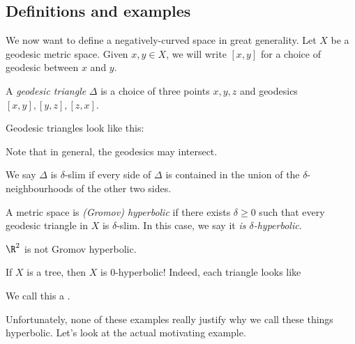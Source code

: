 \documentclass[a4paper]{article}
\begin{document}
\subsection{Definitions and examples}
We now want to define a negatively-curved space in great generality. Let $X$ be a geodesic metric space. Given $x, y \in X$, we will write $[x, y]$ for a choice of geodesic between $x$ and $y$.

\begin{defi}
  A \emph{geodesic triangle} $\Delta$ is a choice of three points $x, y, z$ and geodesics $[x, y], [y, z], [z, x]$.
\end{defi}
Geodesic triangles look like this:
\begin{center}
\end{center}
Note that in general, the geodesics may intersect.

\begin{defi}
  We say $\Delta$ is $\delta$-slim if every side of $\Delta$ is contained in the union of the $\delta$-neighbourhoods of the other two sides.
\end{defi}

\begin{defi}
  A metric space is \emph{(Gromov) hyperbolic} if there exists $\delta \geq 0$ such that every geodesic triangle in $X$ is $\delta$-slim. In this case, we say it \emph{is $\delta$-hyperbolic}.
\end{defi}

\begin{eg}
  $\R^2$ is not Gromov hyperbolic.
\end{eg}

\begin{eg}
  If $X$ is a tree, then $X$ is $0$-hyperbolic! Indeed, each triangle looks like
  \begin{center}
  \end{center}
  We call this a .
\end{eg}
Unfortunately, none of these examples really justify why we call these things hyperbolic. Let's look at the actual motivating example.
\end{document}
